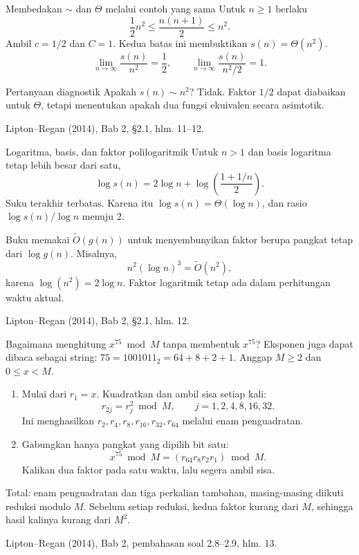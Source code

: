 \documentclass[aspectratio=169,11pt]{beamer}
\newcommand{\bookref}[1]{\par\vfill{\scriptsize\color{gray}Lipton--Regan (2014), Bab 2, #1.}}
\begin{document}
\begin{frame}{Membedakan $\sim$ dan $\Theta$ melalui contoh yang sama}
Untuk $n\ge1$ berlaku
\[
\frac12 n^2\le\frac{n(n+1)}2\le n^2.
\]
Ambil $c=1/2$ dan $C=1$. Kedua batas ini membuktikan $s(n)=\Theta(n^2)$.
\[
\lim_{n\to\infty}\frac{s(n)}{n^2}=\frac12,\qquad
\lim_{n\to\infty}\frac{s(n)}{n^2/2}=1.
\]
\begin{block}{Pertanyaan diagnostik}
Apakah $s(n)\sim n^2$? Tidak. Faktor $1/2$ dapat diabaikan untuk $\Theta$, tetapi menentukan apakah dua fungsi ekuivalen secara asimtotik.
\end{block}
\bookref{\S2.1, hlm. 11--12}
\end{frame}

\begin{frame}{Logaritma, basis, dan faktor polilogaritmik}
Untuk $n>1$ dan basis logaritma tetap lebih besar dari satu,
\[
\log s(n)=2\log n+\log\!\left(\frac{1+1/n}{2}\right).
\]
Suku terakhir terbatas. Karena itu $\log s(n)=\Theta(\log n)$, dan rasio $\log s(n)/\log n$ menuju $2$.
\par\medskip
Buku memakai $\widetilde O(g(n))$ untuk menyembunyikan faktor berupa pangkat tetap dari $\log g(n)$. Misalnya,
\[
n^2(\log n)^3=\widetilde O(n^2),
\]
karena $\log(n^2)=2\log n$. Faktor logaritmik tetap ada dalam perhitungan waktu aktual.
\bookref{\S2.1, hlm. 12}
\end{frame}

\begin{frame}{Bagaimana menghitung $x^{75}\bmod M$ tanpa membentuk $x^{75}$?}
\small
Eksponen juga dapat dibaca sebagai string: $75=1001011_2=64+8+2+1$. Anggap $M\ge2$ dan $0\le x<M$.
\begin{enumerate}
\item Mulai dari $r_1=x$. Kuadratkan dan ambil sisa setiap kali:
\[
r_{2j}=r_j^2\bmod M,\qquad j=1,2,4,8,16,32.
\]
Ini menghasilkan $r_2,r_4,r_8,r_{16},r_{32},r_{64}$ melalui enam penguadratan.
\item Gabungkan hanya pangkat yang dipilih bit satu:
\[
x^{75}\bmod M=(r_{64}r_8r_2r_1)\bmod M.
\]
Kalikan dua faktor pada satu waktu, lalu segera ambil sisa.
\end{enumerate}
Total: enam penguadratan dan tiga perkalian tambahan, masing-masing diikuti reduksi modulo $M$. Sebelum setiap reduksi, kedua faktor kurang dari $M$, sehingga hasil kalinya kurang dari $M^2$.
\bookref{pembahasan soal 2.8--2.9, hlm. 13}
\end{frame}
\end{document}
